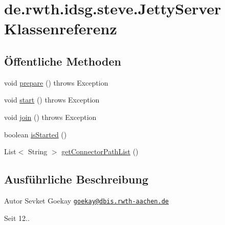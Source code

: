 \hypertarget{classde_1_1rwth_1_1idsg_1_1steve_1_1_jetty_server}{\section{de.\-rwth.\-idsg.\-steve.\-Jetty\-Server Klassenreferenz}
\label{classde_1_1rwth_1_1idsg_1_1steve_1_1_jetty_server}
}
\subsection*{Öffentliche Methoden}
\begin{DoxyCompactItemize}
\item 
void \hyperlink{classde_1_1rwth_1_1idsg_1_1steve_1_1_jetty_server_af3d367767a64addf3ad333b6b870c8b5}{prepare} ()  throws Exception 
\item 
void \hyperlink{classde_1_1rwth_1_1idsg_1_1steve_1_1_jetty_server_a8ef6c91015dbe98a901f843d583f1685}{start} ()  throws Exception 
\item 
void \hyperlink{classde_1_1rwth_1_1idsg_1_1steve_1_1_jetty_server_aa5e5a66ea19ce47cc0363d34700073cd}{join} ()  throws Exception 
\item 
boolean \hyperlink{classde_1_1rwth_1_1idsg_1_1steve_1_1_jetty_server_a8fd83525bd349bd2d3cfb647216c2f9b}{is\-Started} ()
\item 
List$<$ String $>$ \hyperlink{classde_1_1rwth_1_1idsg_1_1steve_1_1_jetty_server_a4c8ee555ae6f61194315876112b02463}{get\-Connector\-Path\-List} ()
\end{DoxyCompactItemize}


\subsection{Ausführliche Beschreibung}
\begin{DoxyAuthor}{Autor}
Sevket Goekay \href{mailto:goekay@dbis.rwth-aachen.de}{\tt goekay@dbis.\-rwth-\/aachen.\-de} 
\end{DoxyAuthor}
\begin{DoxySince}{Seit}
12.. 
\end{DoxySince}


